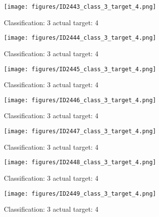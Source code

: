 \begin{figure}[h!]
\begin{center}
\texttt{[image: figures/ID2443\_class\_3\_target\_4.png]}
\end{center}
\caption{ Classification: 3 actual target: 4}
\label{fig:ID2443_class_3_target_4}
\end{figure}
\begin{figure}[h!]
\begin{center}
\texttt{[image: figures/ID2444\_class\_3\_target\_4.png]}
\end{center}
\caption{ Classification: 3 actual target: 4}
\label{fig:ID2444_class_3_target_4}
\end{figure}
\begin{figure}[h!]
\begin{center}
\texttt{[image: figures/ID2445\_class\_3\_target\_4.png]}
\end{center}
\caption{ Classification: 3 actual target: 4}
\label{fig:ID2445_class_3_target_4}
\end{figure}
\begin{figure}[h!]
\begin{center}
\texttt{[image: figures/ID2446\_class\_3\_target\_4.png]}
\end{center}
\caption{ Classification: 3 actual target: 4}
\label{fig:ID2446_class_3_target_4}
\end{figure}
\begin{figure}[h!]
\begin{center}
\texttt{[image: figures/ID2447\_class\_3\_target\_4.png]}
\end{center}
\caption{ Classification: 3 actual target: 4}
\label{fig:ID2447_class_3_target_4}
\end{figure}
\begin{figure}[h!]
\begin{center}
\texttt{[image: figures/ID2448\_class\_3\_target\_4.png]}
\end{center}
\caption{ Classification: 3 actual target: 4}
\label{fig:ID2448_class_3_target_4}
\end{figure}
\begin{figure}[h!]
\begin{center}
\texttt{[image: figures/ID2449\_class\_3\_target\_4.png]}
\end{center}
\caption{ Classification: 3 actual target: 4}
\label{fig:ID2449_class_3_target_4}
\end{figure}
